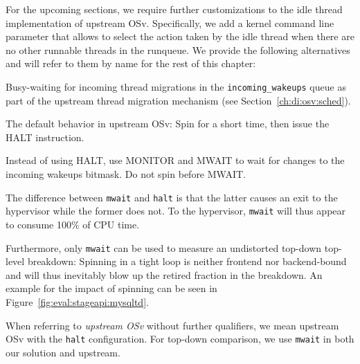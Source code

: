 \documentclass[12pt,a4paper]{book}
\begin{document}
For the upcoming sections, we require further customizations to the idle thread implementation of upstream OSv.
Specifically, we add a kernel command line parameter that allows to select the action taken by the idle thread when there are no other runnable threads in the runqueue.
We provide the following alternatives and will refer to them by name for the rest of this chapter:
\begin{description}[labelwidth=3em,leftmargin=3.5em]
    \item[\texttt{busy}] Busy-waiting for incoming thread migrations in the \lstinline[style=figurecpp]{incoming_wakeups} queue as part of the upstream thread migration mechanism (see Section~\ref{ch:di:osv:sched}).
    \item[\texttt{halt}] The default behavior in upstream OSv: Spin for a short time, then issue the HALT instruction.
    \item[\texttt{mwait}] Instead of using HALT, use MONITOR and MWAIT to wait for changes to the incoming wakeups bitmask. Do not spin before MWAIT.
\end{description}
The difference between \texttt{mwait} and \texttt{halt} is that the latter causes an exit to the hypervisor while the former does not.
To the hypervisor, \texttt{mwait} will thus appear to consume 100\% of CPU time.

Furthermore, only \texttt{mwait} can be used to measure an undistorted top-down top-level breakdown:
Spinning in a tight loop is neither frontend nor backend-bound and will thus inevitably blow up the retired fraction in the breakdown.
An example for the impact of spinning can be seen in Figure~\ref{fig:eval:stageapi:mysqltd}.

When referring to \emph{upstream OSv} without further qualifiers, we mean upstream OSv with the \texttt{halt} configuration.
For top-down comparison, we use \texttt{mwait} in both our solution and upstream.

\clearpage
\end{document}
